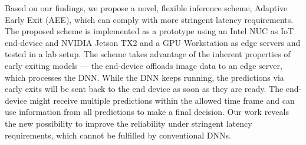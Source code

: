 \begin{justify}
\begin{small}
{{				\newline
				Based on our findings, we propose a novel, flexible inference scheme, Adaptive Early Exit (AEE), which can comply with more stringent latency requirements. The proposed scheme is implemented as a prototype using an Intel NUC as IoT end-device and NVIDIA Jetson TX2 and a GPU Workstation as edge servers and tested in a lab setup. The scheme takes advantage of the inherent properties of early exiting models — the end-device offloads image data to an edge server, which processes the DNN. While the DNN keeps running, the predictions via early exits will be sent back to the end device as soon as they are ready. The end-device might receive multiple predictions within the allowed time frame and can use information from all predictions to make a final decision. Our work reveals the new possibility to improve the reliability under stringent latency requirements, which cannot be fulfilled by conventional DNNs. 
		}}
	\end{small}
\end{justify}